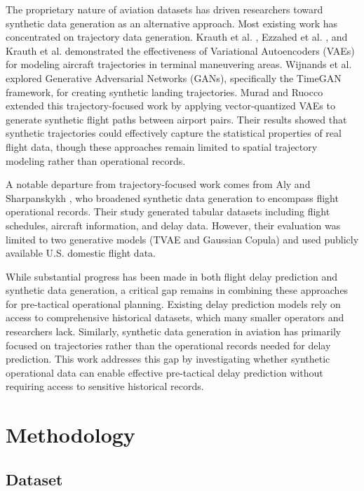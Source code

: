 \documentclass[conference]{IEEEtran}
\begin{document}
The proprietary nature of aviation datasets has driven researchers toward synthetic data generation as an alternative approach. Most existing work has concentrated on trajectory data generation. Krauth et al. \cite{krauth2023deep}, Ezzahed et al. \cite{ezzahed2022bringing}, and Krauth et al. \cite{krauth2024advanced} demonstrated the effectiveness of Variational Autoencoders (VAEs) for modeling aircraft trajectories in terminal maneuvering areas. Wijnands et al. \cite{wijnands2024generation} explored Generative Adversarial Networks (GANs), specifically the TimeGAN framework, for creating synthetic landing trajectories. Murad and Ruocco \cite{murad2025synthetic} extended this trajectory-focused work by applying vector-quantized VAEs to generate synthetic flight paths between airport pairs. Their results showed that synthetic trajectories could effectively capture the statistical properties of real flight data, though these approaches remain limited to spatial trajectory modeling rather than operational records. 

A notable departure from trajectory-focused work comes from Aly and Sharpanskykh \cite{aly2025synthetic}, who broadened synthetic data generation to encompass flight operational records. Their study generated tabular datasets including flight schedules, aircraft information, and delay data. However, their evaluation was limited to two generative models (TVAE and Gaussian Copula) and used publicly available U.S. domestic flight data.


While substantial progress has been made in both flight delay prediction and synthetic data generation, a critical gap remains in combining these approaches for pre-tactical operational planning. Existing delay prediction models rely on access to comprehensive historical datasets, which many smaller operators and researchers lack. Similarly, synthetic data generation in aviation has primarily focused on trajectories rather than the operational records needed for delay prediction. This work addresses this gap by investigating whether synthetic operational data can enable effective pre-tactical delay prediction without requiring access to sensitive historical records.



\section{Methodology}

\subsection{Dataset}
\end{document}
